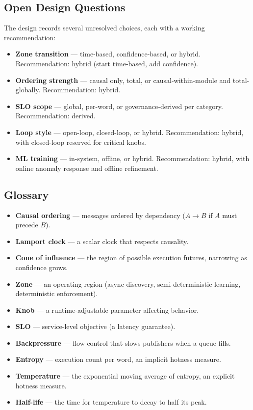 \subsection{Open Design Questions}

The design records several unresolved choices, each with a working recommendation:

\begin{itemize}
  \item \textbf{Zone transition} --- time-based, confidence-based, or hybrid.
        Recommendation: hybrid (start time-based, add confidence).
  \item \textbf{Ordering strength} --- causal only, total, or causal-within-module
        and total-globally. Recommendation: hybrid.
  \item \textbf{SLO scope} --- global, per-word, or governance-derived per category.
        Recommendation: derived.
  \item \textbf{Loop style} --- open-loop, closed-loop, or hybrid. Recommendation:
        hybrid, with closed-loop reserved for critical knobs.
  \item \textbf{ML training} --- in-system, offline, or hybrid. Recommendation:
        hybrid, with online anomaly response and offline refinement.
\end{itemize}

\subsection{Glossary}

\begin{itemize}
  \item \textbf{Causal ordering} --- messages ordered by dependency ($A \to B$ if
        $A$ must precede $B$).
  \item \textbf{Lamport clock} --- a scalar clock that respects causality.
  \item \textbf{Cone of influence} --- the region of possible execution futures,
        narrowing as confidence grows.
  \item \textbf{Zone} --- an operating region (async discovery, semi-deterministic
        learning, deterministic enforcement).
  \item \textbf{Knob} --- a runtime-adjustable parameter affecting behavior.
  \item \textbf{SLO} --- service-level objective (a latency guarantee).
  \item \textbf{Backpressure} --- flow control that slows publishers when a queue
        fills.
  \item \textbf{Entropy} --- execution count per word, an implicit hotness measure.
  \item \textbf{Temperature} --- the exponential moving average of entropy, an
        explicit hotness measure.
  \item \textbf{Half-life} --- the time for temperature to decay to half its peak.
\end{itemize}
